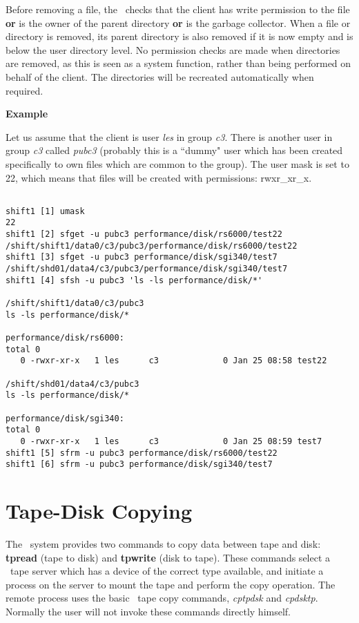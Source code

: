 Before removing a file, the \DPM\ checks that the
client has write permission to the file {\bf or}
is the owner of the parent
directory {\bf or} is the garbage collector. When a file
or directory is removed, its parent directory is also
removed if it is now empty and is below the user directory level.
No permission checks are made when directories are removed, as this is
seen as a system function, rather than being performed on behalf of the
client. The directories will be recreated automatically when required.
 
 
{\bf Example}
 
Let us assume that the client is user {\it les} in group {\it c3}. There is
 another
user in group {\it c3} called {\it pubc3} (probably this is a ``dummy" user
 which has been
created specifically
to own files which are common to the group). The user mask is set to 22, which
 means that
files will be created with permissions: rwxr\_xr\_x.
 
 
\begin{verbatim}
 
shift1 [1] umask
22
shift1 [2] sfget -u pubc3 performance/disk/rs6000/test22
/shift/shift1/data0/c3/pubc3/performance/disk/rs6000/test22
shift1 [3] sfget -u pubc3 performance/disk/sgi340/test7
/shift/shd01/data4/c3/pubc3/performance/disk/sgi340/test7
shift1 [4] sfsh -u pubc3 'ls -ls performance/disk/*'
 
/shift/shift1/data0/c3/pubc3
ls -ls performance/disk/*
 
performance/disk/rs6000:
total 0
   0 -rwxr-xr-x   1 les      c3             0 Jan 25 08:58 test22
 
/shift/shd01/data4/c3/pubc3
ls -ls performance/disk/*
 
performance/disk/sgi340:
total 0
   0 -rwxr-xr-x   1 les      c3             0 Jan 25 08:59 test7
shift1 [5] sfrm -u pubc3 performance/disk/rs6000/test22
shift1 [6] sfrm -u pubc3 performance/disk/sgi340/test7
\end{verbatim}
 
 
\section{Tape-Disk Copying}
 
The \shift\ system provides two commands to copy data between tape and disk:
{\bf tpread} (tape to disk) and {\bf tpwrite} (disk to tape). These commands
select a \shift\ tape server which has a device of the correct type available,
and initiate a process on the server to mount the tape and perform the copy
 operation.
The remote process uses the basic \shift\ tape copy commands, {\it cptpdsk}
and {\it cpdsktp}.%
Normally the user
will not invoke these commands directly himself.
 
